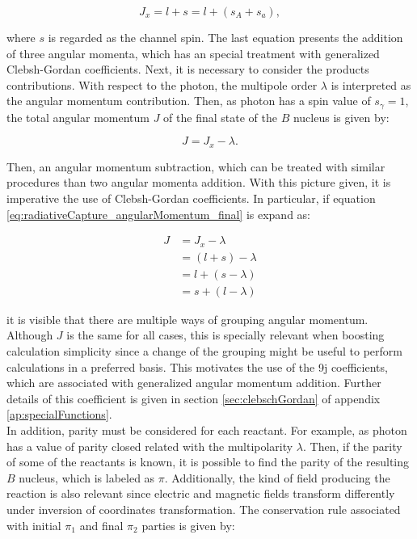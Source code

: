 \documentclass[openany]{book}
\begin{document}
\begin{equation}  \label{eq:radiativeCapture_angularMomentum_reactants}
	J_x = l + s = l + (s_A + s_a),
\end{equation}

where $s$ is regarded as the channel spin. The last equation presents the addition of three angular momenta, which has an special treatment with generalized Clebsh-Gordan coefficients. Next, it is necessary to consider the products contributions. With respect to the photon, the multipole order $\lambda$ is interpreted as the angular momentum contribution. Then, as photon has a spin value of $s_\gamma = 1$, the total angular momentum $J$ of the final state of the $B$ nucleus is given by: 

\begin{equation}  \label{eq:radiativeCapture_angularMomentum_final}
	J = J_x - \lambda.
\end{equation}

Then, an angular momentum subtraction, which can be treated with similar procedures than two angular momenta addition.  With this picture given, it is imperative the use of Clebsh-Gordan coefficients. In particular, if equation \ref{eq:radiativeCapture_angularMomentum_final} is expand as: 

\begin{equation}  \label{eq:radiativeCapture_angularMomentum_expanded}
	\begin{split}
		J  &= J_x - \lambda \\
			&= (l + s) - \lambda \\
			&= l + (s - \lambda) \\
			&= s + (l - \lambda)
	\end{split}
\end{equation}

it is visible that there are multiple ways of grouping angular momentum. Although $J$ is the same for all cases,  this is specially relevant when boosting calculation simplicity since a change of the grouping might be useful to perform calculations in a preferred basis. This motivates the use of the 9j coefficients, which are associated with generalized angular momentum addition. Further details of this coefficient is given in section \ref{sec:clebschGordan} of appendix \ref{ap:specialFunctions}. \\

In addition, parity must be considered for each reactant. For example, as photon has a value of parity closed related with the multipolarity $\lambda$. Then, if the parity of some of the reactants is known, it is possible to find the parity of the resulting $B$ nucleus, which is labeled as $\pi$.  Additionally, the kind of field producing the reaction is also relevant since electric and magnetic fields transform differently under inversion of coordinates transformation. The conservation rule associated with initial $\pi_1$ and final $\pi_2$ parties is given by:  
\end{document}

